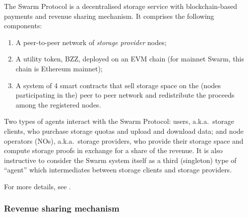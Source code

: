 The Swarm Protocol is a decentralised storage service with blockchain-based payments and revenue sharing mechanism.
%
It comprises the following components:
%
\begin{enumerate}
  \item A peer-to-peer network of \emph{storage provider} nodes;
  \item A utility token, BZZ, deployed on an EVM chain (for mainnet Swarm, this chain is Ethereum mainnet);
  \item A system of 4 smart contracts that sell storage space on the (nodes participating in the) peer to peer network and redistribute the proceeds among the registered nodes.
\end{enumerate}
%
Two types of agents interact with the Swarm Protocol: users, a.k.a.~storage clients, who purchase storage quotas and upload and download data; and node operators (NOs), a.k.a.~storage providers, who provide their storage space and compute storage proofs in exchange for a share of the revenue.
%
It is also instructive to consider the Swarm system itself as a third (singleton) type of ``agent'' which intermediates between storage clients and storage providers.

For more details, see \cite{book-of-swarm}.

\subsubsection{Revenue sharing mechanism}

